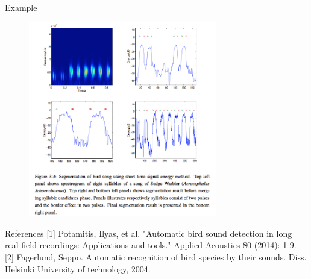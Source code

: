 \documentclass[10pt]{beamer}
\begin{document}
\begin{frame}[fragile]{Example}
\begin{figure}
\includegraphics[width=0.73\textwidth]{example2}
\end{figure}
\end{frame}

\begin{frame}[fragile]{References}
[1] Potamitis, Ilyas, et al. "Automatic bird sound detection in long real-field recordings: Applications and tools." Applied Acoustics 80 (2014): 1-9.\\

[2] Fagerlund, Seppo. Automatic recognition of bird species by their sounds. Diss. Helsinki University of technology, 2004.
\end{frame}
\end{document}
